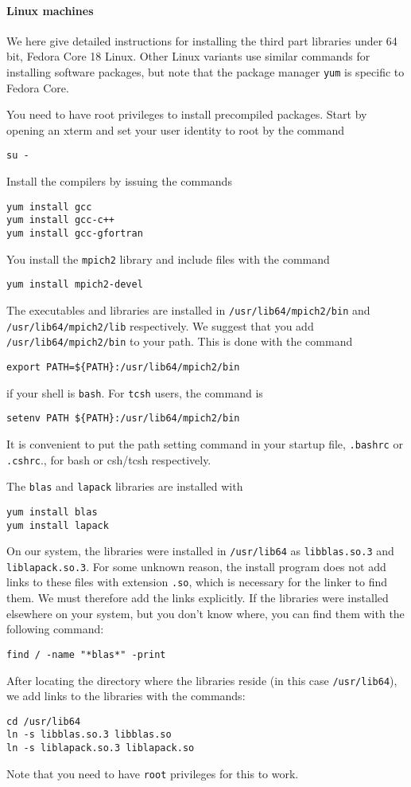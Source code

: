 \documentclass[11pt]{article}
\begin{document}
\paragraph{Linux machines}
We here give detailed instructions for installing the third part libraries under 64 bit, Fedora Core
18 Linux. Other Linux variants use similar commands for installing software packages, but note that 
the package manager \verb+yum+ is specific to Fedora Core.

You need to have root privileges to install precompiled packages. Start by opening an xterm and
set your user identity to root by the command
\begin{verbatim}
su -
\end{verbatim}
Install the compilers by issuing the commands
\begin{verbatim}
yum install gcc
yum install gcc-c++
yum install gcc-gfortran
\end{verbatim}
You install the \verb+mpich2+ library and include files with the command
\begin{verbatim}
yum install mpich2-devel
\end{verbatim}
The executables and libraries are installed in \verb+/usr/lib64/mpich2/bin+ and 
\verb+/usr/lib64/mpich2/lib+ respectively. We suggest that you add \verb+/usr/lib64/mpich2/bin+ to 
your path. This is done with the command
\begin{verbatim}
export PATH=${PATH}:/usr/lib64/mpich2/bin
\end{verbatim}
if your shell is \verb+bash+. For \verb+tcsh+ users, the command is
\begin{verbatim}
setenv PATH ${PATH}:/usr/lib64/mpich2/bin
\end{verbatim}
It is convenient to put the path setting command in
your startup file, \verb+.bashrc+ or \verb+.cshrc+., for bash or csh/tcsh respectively.

The \verb+blas+ and \verb+lapack+ libraries are installed with
\begin{verbatim}
yum install blas
yum install lapack
\end{verbatim}
On our system, the libraries were installed in \verb+/usr/lib64+ as \verb+libblas.so.3+ and
\verb+liblapack.so.3+. For some unknown reason, the install program does not add links to these
files with extension \verb+.so+, which is necessary for the linker to find them. We must therefore
add the links explicitly. If the libraries were installed elsewhere on your system, but you don't
know where, you can find them with the following command:
\begin{verbatim}
find / -name "*blas*" -print
\end{verbatim}
After locating the directory where the libraries reside (in this case \verb+/usr/lib64+), we add
links to the libraries with the commands:
\begin{verbatim}
cd /usr/lib64
ln -s libblas.so.3 libblas.so
ln -s liblapack.so.3 liblapack.so
\end{verbatim}
Note that you need to have \verb+root+ privileges for this to work.
\end{document}
